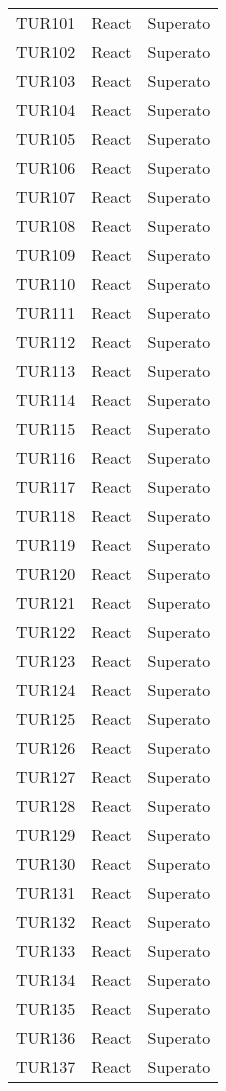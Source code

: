 \documentclass[PianoDiQualifica.tex]{subfiles}
\begin{document}
\begin{longtable}[H]{P{2cm}P{8.5cm}P{3cm}}
	TUR101 & React & Superato \\ 
	TUR102 & React & Superato \\ 
	TUR103 & React & Superato \\ 
	TUR104 & React & Superato \\ 
	TUR105 & React & Superato \\ 
	TUR106 & React & Superato \\ 
	TUR107 & React & Superato \\ 
	TUR108 & React & Superato \\ 
	TUR109 & React & Superato \\ 
	TUR110 & React & Superato \\ 
	TUR111 & React & Superato \\ 
	TUR112 & React & Superato \\ 
	TUR113 & React & Superato \\ 
	TUR114 & React & Superato \\ 
	TUR115 & React & Superato \\ 
	TUR116 & React & Superato \\ 
	TUR117 & React & Superato \\ 
	TUR118 & React & Superato \\ 
	TUR119 & React & Superato \\ 
	TUR120 & React & Superato \\ 
	TUR121 & React & Superato \\ 
	TUR122 & React & Superato \\ 
	TUR123 & React & Superato \\ 
	TUR124 & React & Superato \\ 
	TUR125 & React & Superato \\ 
	TUR126 & React & Superato \\ 
	TUR127 & React & Superato \\ 
	TUR128 & React & Superato \\ 
	TUR129 & React & Superato \\ 
	TUR130 & React & Superato \\ 
	TUR131 & React & Superato \\ 
	TUR132 & React & Superato \\ 
	TUR133 & React & Superato \\ 
	TUR134 & React & Superato \\ 
	TUR135 & React & Superato \\ 
	TUR136 & React & Superato \\ 
	TUR137 & React & Superato \\ 

\end{longtable}
\end{document}

